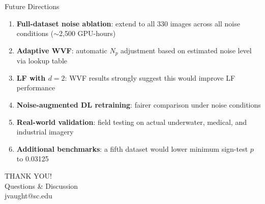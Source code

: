 \documentclass[10pt, aspectratio=169]{beamer}
\begin{document}
\begin{frame}{Future Directions}
  \begin{enumerate}
    \item \textbf{Full-dataset noise ablation}: extend to all 330 images across all noise conditions ($\sim$2,500 GPU-hours)
    \item \textbf{Adaptive WVF}: automatic $N_p$ adjustment based on estimated noise level via lookup table
    \item \textbf{LF with $d = 2$}: WVF results strongly suggest this would improve LF performance
    \item \textbf{Noise-augmented DL retraining}: fairer comparison under noise conditions
    \item \textbf{Real-world validation}: field testing on actual underwater, medical, and industrial imagery
    \item \textbf{Additional benchmarks}: a fifth dataset would lower minimum sign-test $p$ to 0.03125
  \end{enumerate}
\end{frame}

{
  \begin{frame}[plain]
    \vfill
    \centering
    {\fontsize{50}{55}\selectfont\impactfont\color{UofSCWhite} THANK YOU!}\\[1em]
    {\Large\color{UofSCWhite} Questions \& Discussion}\\[0.5em]
    {\normalsize\color{UofSCGray30} jvaught@sc.edu}
    \vfill
  \end{frame}
}
\end{document}
